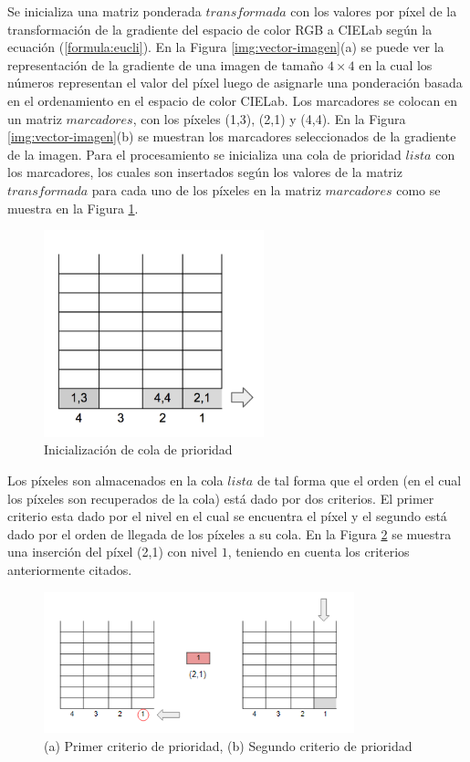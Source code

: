 Se inicializa una matriz ponderada $transformada$ con los valores por píxel de la transformación de la gradiente del espacio de color RGB a CIELab según la ecuación (\ref{formula:eucli}). En la Figura \ref{img:vector-imagen}(a) se puede ver la representación de la gradiente de una imagen de tamaño $4 \times 4$ en la cual los números representan el valor del píxel luego de asignarle una ponderación basada en el ordenamiento en el espacio de color CIELab.
Los marcadores se colocan en un matriz $marcadores$, con los píxeles (1,3), (2,1) y (4,4). En la Figura \ref{img:vector-imagen}(b) se muestran los marcadores seleccionados de la gradiente de la imagen. 
Para el procesamiento se inicializa una cola de prioridad $lista$ con los marcadores, los cuales son insertados según los valores de la matriz $transformada$ para cada uno de los píxeles en la matriz $marcadores$ como se muestra en la Figura \ref{img:cola-inicio}.
\begin{figure}[h!]
\centering
\includegraphics[height=60mm]{./inundacion/cola-inicial.png}
\caption{Inicialización de cola de prioridad}
\label{img:cola-inicio}
\end{figure}
Los píxeles son almacenados en la cola $lista$ de tal forma que el orden (en el cual los píxeles son recuperados de la cola) está dado por dos criterios. El primer criterio esta dado por el nivel en el cual se encuentra el píxel y el segundo está dado por el orden de llegada de los píxeles a su cola. En la Figura \ref{img:prioridad-cola} se muestra una inserción del píxel (2,1) con nivel $1$, teniendo en cuenta los criterios anteriormente citados.
\begin{figure}[h!]
\centering
\includegraphics[width=90mm]{./inundacion/prioridad-cola.png}
\caption{(a) Primer criterio de prioridad, (b) Segundo criterio de prioridad}
\label{img:prioridad-cola}
\end{figure}
